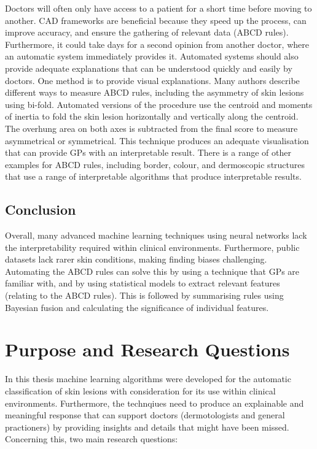 Doctors will often only have access to a patient for a short time before moving to another. CAD frameworks are beneficial because they speed up the process, can improve accuracy\cite{Dick2019}, and ensure the gathering of relevant data (ABCD rules). Furthermore, it could take days for a second opinion from another doctor, where an automatic system immediately provides it. Automated systems should also provide adequate explanations that can be understood quickly and easily by doctors\cite{Lipton2018}. One method is to provide visual explanations. Many authors\cite{Zaqout2016, Kasmi2016, Ali2020a} describe different ways to measure ABCD rules, including the asymmetry of skin lesions using bi-fold. Automated versions of the procedure use the centroid and moments of inertia to fold the skin lesion horizontally and vertically along the centroid. The overhung area on both axes is subtracted from the final score to measure asymmetrical or symmetrical. This technique produces an adequate visualisation that can provide GPs with an interpretable result. There is a range of other examples for ABCD rules, including border\cite{Kasmi2016, Zaqout2016, Ali2020b}, colour\cite{She2007, Tenenhaus2010, Kasmi2016}, and dermoscopic structures\cite{Lopez-Labraca2018} that use a range of interpretable algorithms that produce interpretable results.

\subsection{Conclusion}
Overall, many advanced machine learning techniques using neural networks lack the interpretability required within clinical environments. Furthermore, public datasets lack rarer skin conditions, making finding biases challenging. Automating the ABCD rules can solve this by using a technique that GPs are familiar with, and by using statistical models to extract relevant features (relating to the ABCD rules). This is followed by summarising rules using Bayesian fusion and calculating the significance of individual features.

\section{Purpose and Research Questions}
In this thesis machine learning algorithms were developed for the automatic classification of skin lesions with consideration for its use within clinical environments. Furthermore, the technqiues need to produce an explainable and meaningful response that can support doctors (dermotologists and general practioners) by providing insights and details that might have been missed. Concerning this, two main research questions:

